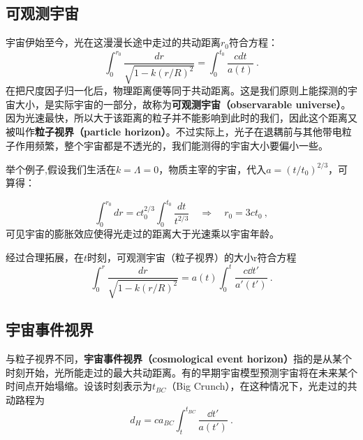 

\subsection{可观测宇宙}
宇宙伊始至今，光在这漫漫长途中走过的共动距离$r_0$符合方程：
\begin{equation}
\int_{0}^{r_{0}} \frac{d r}{\sqrt{1-k (r/R)^{2}}}=\int_{0}^{t_{0}} \frac{c d t}{a(t)}~.
\end{equation}
在把尺度因子归一化后，物理距离便等同于共动距离。这是我们原则上能探测的宇宙大小，是实际宇宙的一部分，故称为\textbf{可观测宇宙（observarable universe）}。因为光速最快，所以大于该距离的粒子并不能影响到此时的我们，因此这个距离又被叫作\textbf{粒子视界（particle horizon）}。不过实际上，光子在退耦前与其他带电粒子作用频繁，整个宇宙都是不透光的，我们能测得的宇宙大小要偏小一些。

举个例子,假设我们生活在$k=\Lambda=0$，物质主宰的宇宙，代入$a=(t/t_0)^{2/3}$，可算得：

\begin{equation}\int_0^{r_0}dr=ct_0^{2/3}\int_0^{t_0}\frac{dt}{t^{2/3}}\quad\Longrightarrow\quad r_0=3ct_0 ~,\end{equation}
可见宇宙的膨胀效应使得光走过的距离大于光速乘以宇宙年龄。

经过合理拓展，在$t$时刻，可观测宇宙（粒子视界）的大小r符合方程
\begin{equation}
\int_{0}^{r} \frac{d r}{\sqrt{1-k (r/R)^{2}}}=a(t)\int_{0}^{t} \frac{c \dd t'}{a'(t')}~.
\end{equation}

\subsection{宇宙事件视界}
与粒子视界不同，\textbf{宇宙事件视界（cosmological event horizon）}指的是从某个时刻开始，光所能走过的最大共动距离。有的早期宇宙模型预测宇宙将在未来某个时间点开始塌缩。设该时刻表示为$t_{BC}$（Big Crunch），在这种情况下，光走过的共动路程为
\begin{equation}
d_H=ca_{BC}\int^{t_{BC}}_{t}\frac{\dd t'}{a(t')}~.
\end{equation}
